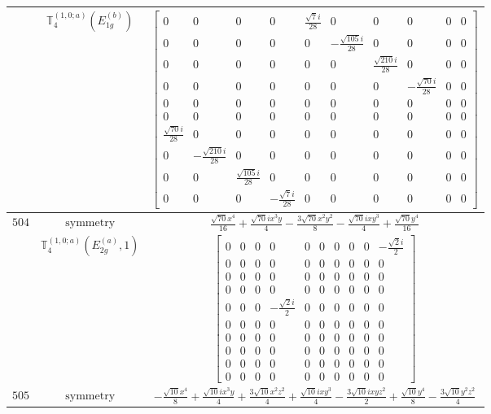 \documentclass[fleqn,8pt,landscape]{jsarticle}
\begin{document}
\begin{longtable}{ccc}
$  $ & $ \mathbb{T}_{4}^{(1,0;a)}(E_{1g}^{(b)}) $ & $ \begin{bmatrix} 0 & 0 & 0 & 0 & \frac{\sqrt{7} i}{28} & 0 & 0 & 0 & 0 & 0 \\ 0 & 0 & 0 & 0 & 0 & - \frac{\sqrt{105} i}{28} & 0 & 0 & 0 & 0 \\ 0 & 0 & 0 & 0 & 0 & 0 & \frac{\sqrt{210} i}{28} & 0 & 0 & 0 \\ 0 & 0 & 0 & 0 & 0 & 0 & 0 & - \frac{\sqrt{70} i}{28} & 0 & 0 \\ 0 & 0 & 0 & 0 & 0 & 0 & 0 & 0 & 0 & 0 \\ 0 & 0 & 0 & 0 & 0 & 0 & 0 & 0 & 0 & 0 \\ \frac{\sqrt{70} i}{28} & 0 & 0 & 0 & 0 & 0 & 0 & 0 & 0 & 0 \\ 0 & - \frac{\sqrt{210} i}{28} & 0 & 0 & 0 & 0 & 0 & 0 & 0 & 0 \\ 0 & 0 & \frac{\sqrt{105} i}{28} & 0 & 0 & 0 & 0 & 0 & 0 & 0 \\ 0 & 0 & 0 & - \frac{\sqrt{7} i}{28} & 0 & 0 & 0 & 0 & 0 & 0 \end{bmatrix} $ \\ \hline
$ 504 $ & $ \text{symmetry} $ & $ \frac{\sqrt{70} x^{4}}{16} + \frac{\sqrt{70} i x^{3} y}{4} - \frac{3 \sqrt{70} x^{2} y^{2}}{8} - \frac{\sqrt{70} i x y^{3}}{4} + \frac{\sqrt{70} y^{4}}{16} $ \\
$  $ & $ \mathbb{T}_{4}^{(1,0;a)}(E_{2g}^{(a)},1) $ & $ \begin{bmatrix} 0 & 0 & 0 & 0 & 0 & 0 & 0 & 0 & 0 & - \frac{\sqrt{2} i}{2} \\ 0 & 0 & 0 & 0 & 0 & 0 & 0 & 0 & 0 & 0 \\ 0 & 0 & 0 & 0 & 0 & 0 & 0 & 0 & 0 & 0 \\ 0 & 0 & 0 & 0 & 0 & 0 & 0 & 0 & 0 & 0 \\ 0 & 0 & 0 & - \frac{\sqrt{2} i}{2} & 0 & 0 & 0 & 0 & 0 & 0 \\ 0 & 0 & 0 & 0 & 0 & 0 & 0 & 0 & 0 & 0 \\ 0 & 0 & 0 & 0 & 0 & 0 & 0 & 0 & 0 & 0 \\ 0 & 0 & 0 & 0 & 0 & 0 & 0 & 0 & 0 & 0 \\ 0 & 0 & 0 & 0 & 0 & 0 & 0 & 0 & 0 & 0 \\ 0 & 0 & 0 & 0 & 0 & 0 & 0 & 0 & 0 & 0 \end{bmatrix} $ \\ \hline
$ 505 $ & $ \text{symmetry} $ & $ - \frac{\sqrt{10} x^{4}}{8} + \frac{\sqrt{10} i x^{3} y}{4} + \frac{3 \sqrt{10} x^{2} z^{2}}{4} + \frac{\sqrt{10} i x y^{3}}{4} - \frac{3 \sqrt{10} i x y z^{2}}{2} + \frac{\sqrt{10} y^{4}}{8} - \frac{3 \sqrt{10} y^{2} z^{2}}{4} $ \\

\end{longtable}
\end{document}
